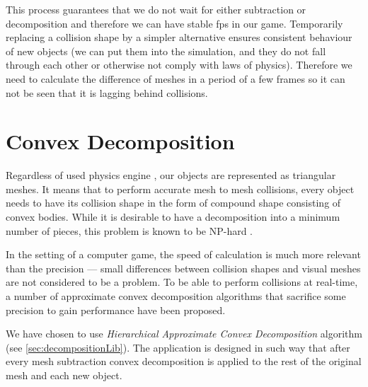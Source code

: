 This process guarantees that we do not wait for either subtraction or decomposition and therefore we can have stable fps in our game. Temporarily replacing a collision shape by a simpler alternative ensures consistent behaviour of new objects (we can put them into the simulation, and they do not fall through each other or otherwise not comply with laws of physics). Therefore we need to calculate the difference of meshes in a period of a few frames so it can not be seen that it is lagging behind collisions.

\section{Convex Decomposition}
\label{sec:decomposition}
Regardless of used physics engine , our objects are represented as triangular meshes. It means  that to perform accurate mesh to mesh collisions, every object needs to have its collision shape in the form of compound shape consisting of convex bodies. While it is desirable to have a decomposition into a minimum number of pieces, this problem is known to be NP-hard \cite{convexDecomp}. 

In the setting of a computer game, the speed of calculation is much more relevant than the precision --- small differences between collision shapes and visual meshes are not considered to be a problem. To be able to perform collisions at real-time, a number of approximate convex decomposition algorithms that sacrifice some precision to gain performance have been proposed. 

We have chosen to use \emph{Hierarchical Approximate Convex Decomposition} algorithm (see \cref{sec:decompositionLib}). The application is designed in such way that after every mesh subtraction convex decomposition is applied to the rest of the original mesh and each new object.

